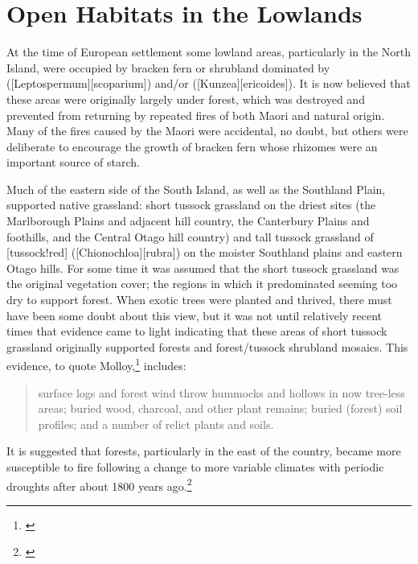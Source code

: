\chapter{Open Habitats in the Lowlands}%
\label{ch:openhabitats}

At the time of European settlement some lowland areas, particularly in the North Island, were occupied by bracken fern or shrubland dominated by  ([Leptospermum][scoparium]) and/or  ([Kunzea][ericoides]).
It is now believed that these areas were originally largely under forest, which was destroyed and prevented from returning by repeated fires of both Maori and natural origin.
Many of the fires caused by the Maori were accidental, no doubt, but others were deliberate to encourage the growth of bracken fern whose rhizomes were an important source of starch.

Much of the eastern side of the South Island, as well as the Southland Plain, supported native grassland: short tussock grassland on the driest sites (the Marlborough Plains and adjacent hill country, the Canterbury Plains and foothills, and the Central Otago hill country) and tall tussock grassland of [tussock!red] ([Chionochloa][rubra]) on the moister Southland plains and eastern Otago hills.
For some time it was assumed that the short tussock grassland was the original vegetation cover; the regions in which it predominated seeming too dry to support forest.
When exotic trees were planted and thrived, there must have been some doubt about this view, but it was not until relatively recent times that evidence came to light indicating that these areas of short tussock grassland originally supported forests and forest/tussock shrubland mosaics.
This evidence, to quote Molloy,\footnote{\cite{molloybpj1963distribution}} includes:

\begin{quote}
	surface logs and forest wind throw hummocks and hollows in now tree-less areas; buried wood, charcoal, and other plant remains; buried (forest) soil profiles; and a number of relict plants and soils.
\end{quote}

It is suggested that forests, particularly in the east of the country, became more susceptible to fire following a change to more variable climates with periodic droughts after about 1800 years ago.\footnote{\cite{mcglone1977ascarina}}

